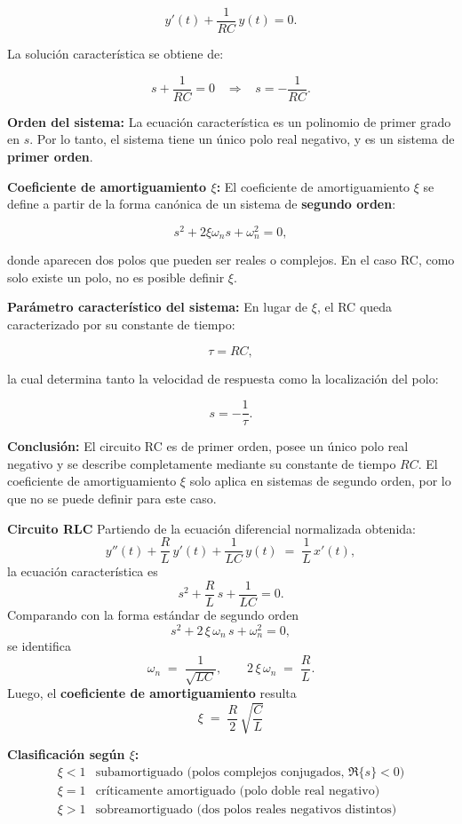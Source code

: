 \[
y'(t) + \frac{1}{RC}\,y(t) = 0.
\]

La solución característica se obtiene de:

\[
s + \frac{1}{RC} = 0 
\;\;\;\Rightarrow\;\;\; s = -\frac{1}{RC}.
\]

\textbf{Orden del sistema:}  
La ecuación característica es un polinomio de primer grado en $s$.  
Por lo tanto, el sistema tiene un único polo real negativo, y es un sistema de \textbf{primer orden}.  

\textbf{Coeficiente de amortiguamiento $\xi$:}  
El coeficiente de amortiguamiento $\xi$ se define a partir de la forma canónica de un sistema de \textbf{segundo orden}:

\[
s^2 + 2\xi \omega_n s + \omega_n^2 = 0,
\]

donde aparecen dos polos que pueden ser reales o complejos.  
En el caso RC, como solo existe un polo, no es posible definir $\xi$.

\textbf{Parámetro característico del sistema:}  
En lugar de $\xi$, el RC queda caracterizado por su constante de tiempo:

\[
\tau = RC,
\]

la cual determina tanto la velocidad de respuesta como la localización del polo:

\[
s = -\frac{1}{\tau}.
\]

\textbf{Conclusión:}  
El circuito RC es de primer orden, posee un único polo real negativo y se describe completamente mediante su constante de tiempo $RC$.  
El coeficiente de amortiguamiento $\xi$ solo aplica en sistemas de segundo orden, por lo que no se puede definir para este caso.


\bigskip

\textbf{Circuito RLC}
Partiendo de la ecuación diferencial normalizada obtenida:
\[
y''(t) + \frac{R}{L}\,y'(t) + \frac{1}{LC}\,y(t) \;=\; \frac{1}{L}\,x'(t),
\]
la ecuación característica es 
\[
s^{2} + \frac{R}{L}\,s + \frac{1}{LC} = 0.
\]
Comparando con la forma estándar de segundo orden
\[
s^{2} + 2\,\xi\,\omega_n\,s + \omega_n^{2} = 0,
\]
se identifica
\[
\omega_n \;=\; \frac{1}{\sqrt{LC}}, 
\qquad
2\,\xi\,\omega_n \;=\; \frac{R}{L}.
\]
Luego, el \textbf{coeficiente de amortiguamiento} resulta
\[
\boxed{\;\xi \;=\; \frac{R}{2}\,\sqrt{\frac{C}{L}}\;}
\]

\textbf{Clasificación según $\xi$:}
\[
\begin{array}{ll}
\xi < 1 & \text{subamortiguado (polos complejos conjugados, }\Re\{s\}<0\text{)}\\[2pt]
\xi = 1 & \text{críticamente amortiguado (polo doble real negativo)}\\[2pt]
\xi > 1 & \text{sobreamortiguado (dos polos reales negativos distintos)}
\end{array}
\]

